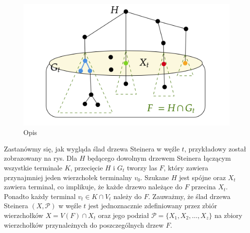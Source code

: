 \documentclass[12pt, oneside]{report}
\begin{document}
\begin{figure}
\centering
\includegraphics[width=16cm]{steiner_tree.png}
\caption{Opis}
\label{steiner_tree}
\end{figure}

Zastanówmy się, jak wygląda ślad drzewa Steinera w węźle $t$, przykładowy został zobrazowany na rys. Dla $H$ będącego dowolnym drzewem Steinera łączącym wszystkie terminale $K$, przecięcie $H$ i $G_t$ tworzy las $F$, który zawiera przynajmniej jeden wierzchołek terminalny $v_0$. Szukane $H$ jest spójne oraz $X_t$ zawiera terminal, co implikuje, że każde drzewo należące do $F$ przecina $X_t$. Ponadto każdy terminal $v_t \in K \cap V_t$ należy do $F$. Zauważmy, że ślad drzewa Steinera $(X, \mathcal{P})$ w węźle $t$ jest jednoznacznie zdefiniowany przez zbiór wierzchołków $X = V(F) \cap X_t$ oraz jego podział $\mathcal{P} = \{X_1, X_2, \dots, X_z\}$ na zbiory wierzchołków przynależnych do poszczególnych drzew $F$.
\end{document}
